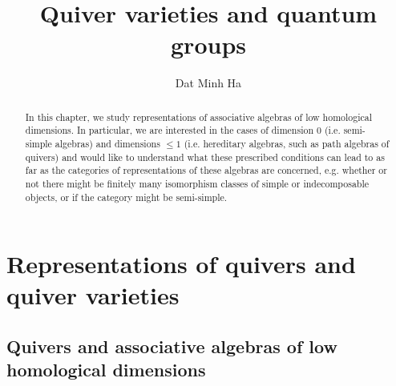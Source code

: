 

\setcounter{chapter}{-1}
\setcounter{section}{-1}





	\title{Quiver varieties and quantum groups}
	
	\author{Dat Minh Ha}
	\maketitle
	
	\begin{abstract}
	    
	\end{abstract}
	
	{
      \hypersetup{} 
      \dominitoc
      \tableofcontents %
    }
    
    
    
    \part{Representations of quivers and quiver varieties}
        \chapter{Quivers and associative algebras of low homological dimensions}
            \begin{abstract}
                In this chapter, we study representations of associative algebras of low homological dimensions. In particular, we are interested in the cases of dimension $0$ (i.e. semi-simple algebras) and dimensions $\leq 1$ (i.e. hereditary algebras, such as path algebras of quivers) and would like to understand what these prescribed conditions can lead to as far as the categories of representations of these algebras are concerned, e.g. whether or not there might be finitely many isomorphism classes of simple or indecomposable objects, or if the category might be semi-simple. 
            \end{abstract}
            
            \minitoc
            
            
            
            
            
            
            
